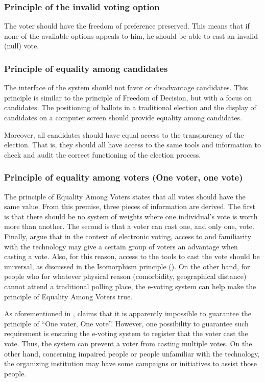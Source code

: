 \documentclass[english]{textolivre}
\begin{document}
\subsubsection{Principle of the invalid voting option}

The voter should have the freedom of preference preserved. This means that if none of the available options appeals to him, he should be able to cast an invalid (null) vote.

\subsubsection{Principle of equality among candidates}

The interface of the system should not favor or disadvantage candidates. This principle is similar to the principle of Freedom of Decision, but with a focus on candidates. The positioning of ballots in a traditional election and the display of candidates on a computer screen should provide equality among candidates.

Moreover, all candidates should have equal access to the transparency of the election. That is, they should all have access to the same tools and information to check and audit the correct functioning of the election process.

\subsubsection{Principle of equality among voters (One voter, one vote) \label{sec-one-vote}}

The principle of Equality Among Voters states that all votes should have the same value. From this premise, three pieces of information are derived. The first is that there should be no system of weights where one individual's vote is worth more than another. The second is that a voter can cast one, and only one, vote.
Finally, \textcite{Phillips} argue that in the context of electronic voting, access to and familiarity with the technology may give a certain group of voters an advantage when casting a vote. Also, for this reason, access to the tools to cast the vote should be universal, as discussed in the Isomorphism principle (). On the other hand, for people who for whatever physical reason (comorbidity, geographical distance) cannot attend a traditional polling place, the e-voting system can help make the principle of Equality Among Voters true.

As aforementioned in , \textcite{Gritzalis} claims that it is apparently impossible to guarantee the principle of “One voter, One vote”. However, one possibility to guarantee such requirement is ensuring the e-voting system to register that the voter cast the vote. Thus, the system can prevent a voter from casting multiple votes. On the other hand, concerning impaired people or people unfamiliar with the technology, the organizing institution may have some campaigns or initiatives to assist those people.
\end{document}
